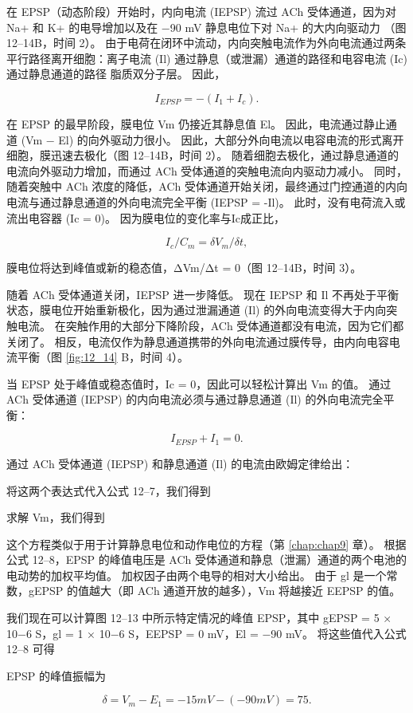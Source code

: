 在 EPSP（动态阶段）开始时，内向电流 (IEPSP) 流过 ACh 受体通道，因为对 Na+ 和 K+ 的电导增加以及在 −90 mV 静息电位下对 Na+ 的大内向驱动力 （图 12–14B，时间 2）。 
由于电荷在闭环中流动，内向突触电流作为外向电流通过两条平行路径离开细胞：离子电流 (Il) 通过静息（或泄漏）通道的路径和电容电流 (Ic) 通过静息通道的路径 脂质双分子层。 因此，


\begin{equation}\label{ionic_current}
	I_{EPSP} = -(I_1 + I_c).
\end{equation}

在 EPSP 的最早阶段，膜电位 Vm 仍接近其静息值 El。
因此，电流通过静止通道 (Vm − El) 的向外驱动力很小。 
因此，大部分外向电流以电容电流的形式离开细胞，膜迅速去极化（图 12–14B，时间 2）。 
随着细胞去极化，通过静息通道的电流向外驱动力增加，而通过 ACh 受体通道的突触电流向内驱动力减小。 
同时，随着突触中 ACh 浓度的降低，ACh 受体通道开始关闭，最终通过门控通道的内向电流与通过静息通道的外向电流完全平衡 (IEPSP = -Il)。 
此时，没有电荷流入或流出电容器 (Ic = 0)。 
因为膜电位的变化率与Ic成正比，


\begin{equation}\label{rate_potential}
	I_c / C_m = \delta V_m / \delta t,
\end{equation}

膜电位将达到峰值或新的稳态值，ΔVm/Δt = 0（图 12–14B，时间 3）。

随着 ACh 受体通道关闭，IEPSP 进一步降低。
现在 IEPSP 和 Il 不再处于平衡状态，膜电位开始重新极化，因为通过泄漏通道 (Il) 的外向电流变得大于内向突触电流。
在突触作用的大部分下降阶段，ACh 受体通道都没有电流，因为它们都关闭了。
相反，电流仅作为静息通道携带的外向电流通过膜传导，由内向电容电流平衡（图 \ref{fig:12_14} B，时间 4）。


当 EPSP 处于峰值或稳态值时，Ic = 0，因此可以轻松计算出 Vm 的值。
通过 ACh 受体通道 (IEPSP) 的内向电流必须与通过静息通道 (Il) 的外向电流完全平衡：

\begin{equation}\label{outward_current}
	I_{EPSP} + I_1 = 0.
\end{equation}

通过 ACh 受体通道 (IEPSP) 和静息通道 (Il) 的电流由欧姆定律给出：

将这两个表达式代入公式 12–7，我们得到

求解 Vm，我们得到

这个方程类似于用于计算静息电位和动作电位的方程（第 \ref{chap:chap9} 章）。 
根据公式 12–8，EPSP 的峰值电压是 ACh 受体通道和静息（泄漏）通道的两个电池的电动势的加权平均值。 
加权因子由两个电导的相对大小给出。 由于 gl 是一个常数，gEPSP 的值越大（即 ACh 通道开放的越多），Vm 将越接近 EEPSP 的值。


我们现在可以计算图 12–13 中所示特定情况的峰值 EPSP，其中 gEPSP = 5 × 10−6 S，gl = 1 × 10−6 S，EEPSP = 0 mV，El = −90 mV。 将这些值代入公式 12–8 可得

EPSP 的峰值振幅为

\begin{equation}\label{peak_amplitude}
	\delta = V_m - E_1 = -15mV - (-90mV) = 75.
\end{equation}



%
